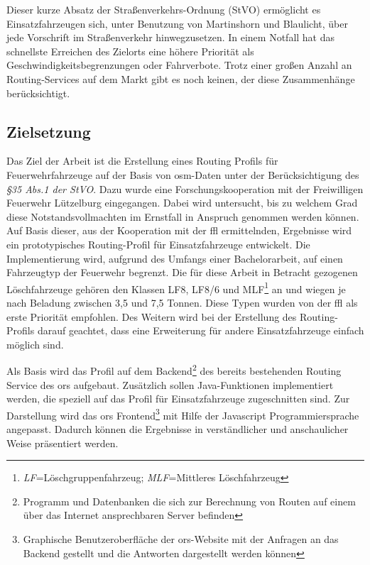 \vspace{1.2cm}

Dieser kurze Absatz der Straßenverkehrs-Ordnung (StVO) ermöglicht es Einsatzfahrzeugen sich, unter Benutzung von Martinshorn und Blaulicht, über jede Vorschrift im Straßenverkehr hinwegzusetzen.
In einem Notfall hat das schnellste Erreichen des Zielorts eine höhere Priorität als Geschwindigkeitsbegrenzungen oder Fahrverbote.
Trotz einer großen Anzahl an Routing-Services auf dem Markt gibt es noch keinen, der diese Zusammenhänge berücksichtigt.

\subsection{Zielsetzung}
Das Ziel der Arbeit ist die Erstellung eines Routing Profils für Feuerwehrfahrzeuge auf der Basis von \gls{osm}-Daten unter der Berücksichtigung des \textit{§35 Abs.1 der StVO}. Dazu wurde eine Forschungskooperation mit der Freiwilligen Feuerwehr Lützelburg eingegangen. Dabei wird untersucht, bis zu welchem Grad diese Notstandsvollmachten im Ernstfall in Anspruch genommen werden können.
Auf Basis dieser, aus der Kooperation mit der \gls{ffl} ermittelnden, Ergebnisse wird ein prototypisches Routing-Profil für Einsatzfahrzeuge entwickelt.
Die Implementierung wird, aufgrund des Umfangs einer Bachelorarbeit, auf einen Fahrzeugtyp der Feuerwehr begrenzt.
Die für diese Arbeit in Betracht gezogenen Löschfahrzeuge gehören den Klassen LF8, LF8/6 und MLF\footnote{\textit{LF}=Löschgruppenfahrzeug; \textit{MLF}=Mittleres Löschfahrzeug} an und wiegen je nach Beladung zwischen 3,5 und 7,5 Tonnen.
Diese Typen wurden von der \gls{ffl} als erste Priorität empfohlen.
Des Weitern wird bei der Erstellung des Routing-Profils darauf geachtet, dass eine Erweiterung für andere Einsatzfahrzeuge einfach möglich sind.
\vspace{0.5cm}

Als Basis wird das Profil auf dem Backend\footnote{Programm und Datenbanken die sich zur Berechnung von Routen auf einem über das Internet ansprechbaren Server befinden} des bereits bestehenden Routing Service des \gls{ors} aufgebaut.
Zusätzlich sollen Java-Funktionen implementiert werden, die speziell auf das Profil für Einsatzfahrzeuge zugeschnitten sind.
Zur Darstellung wird das \gls{ors} Frontend\footnote{Graphische Benutzeroberfläche der \gls{ors}-Website mit der Anfragen an das Backend gestellt und die Antworten dargestellt werden können} mit Hilfe der Javascript Programmiersprache angepasst.
Dadurch können die Ergebnisse in verständlicher und anschaulicher Weise präsentiert werden.